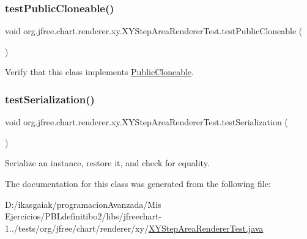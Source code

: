 \subsubsection{\texorpdfstring{test\+Public\+Cloneable()}{testPublicCloneable()}}
{\footnotesize\ttfamily void org.\+jfree.\+chart.\+renderer.\+xy.\+X\+Y\+Step\+Area\+Renderer\+Test.\+test\+Public\+Cloneable (\begin{DoxyParamCaption}{ }\end{DoxyParamCaption})}

Verify that this class implements \mbox{\hyperlink{}{Public\+Cloneable}}. \mbox{\label{classorg_1_1jfree_1_1chart_1_1renderer_1_1xy_1_1_x_y_step_area_renderer_test_a10091580e083a8ec251ecbdc9fd569b9}} 
\subsubsection{\texorpdfstring{test\+Serialization()}{testSerialization()}}
{\footnotesize\ttfamily void org.\+jfree.\+chart.\+renderer.\+xy.\+X\+Y\+Step\+Area\+Renderer\+Test.\+test\+Serialization (\begin{DoxyParamCaption}{ }\end{DoxyParamCaption})}

Serialize an instance, restore it, and check for equality. 

The documentation for this class was generated from the following file\+:\begin{DoxyCompactItemize}
\item 
D\+:/ikasgaiak/programacion\+Avanzada/\+Mis Ejercicios/\+P\+B\+Ldefinitibo2/libs/jfreechart-\/1../tests/org/jfree/chart/renderer/xy/\mbox{\hyperlink{_x_y_step_area_renderer_test_8java}{X\+Y\+Step\+Area\+Renderer\+Test.\+java}}\end{DoxyCompactItemize}
